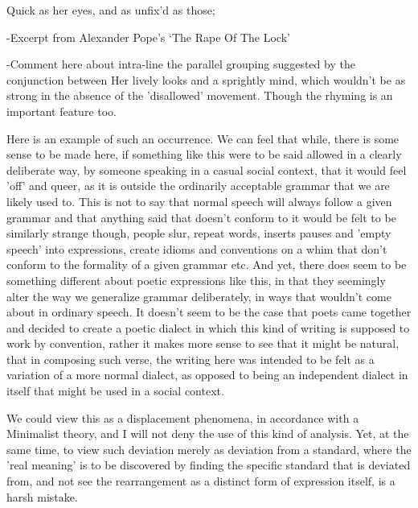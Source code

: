 \documentclass[]{article}
\begin{document}
Quick as her eyes, and as unfix’d as those;

-Excerpt from Alexander Pope’s ‘The Rape Of The Lock’



-Comment here about intra-line the parallel grouping suggested by the conjunction between Her lively looks and  a sprightly mind, which wouldn't be as strong in the absence of the 'disallowed' movement. Though the rhyming is an important feature too.



Here is an example of such an occurrence. We can feel that while, there is some sense to be made here, if something like this were to be said allowed in a clearly deliberate way, by someone speaking in a casual social context, that it would feel 'off' and queer, as it is outside the ordinarily acceptable grammar that we are likely used to. This is not to say that normal speech will always follow a given grammar and that anything said that doesn't conform to it would be felt to be similarly strange though, people slur, repeat words, inserts pauses and 'empty speech' into expressions, create idioms and conventions on a whim that don't conform to the formality of a given grammar etc. And yet, there does seem to be something different about poetic expressions like this, in that they seemingly alter the way we generalize grammar deliberately, in ways that wouldn't come about in ordinary speech. It doesn't seem to be the case that poets came together and decided to create a poetic dialect in which this kind of writing is supposed to work by convention, rather it makes more sense to see that it might be natural, that in composing such verse, the writing here was intended to be felt as a variation of a more normal dialect, as opposed to being an independent dialect in itself that might be used in a social context.



We could view this as a displacement phenomena, in accordance with a Minimalist theory, and I will not deny the use of this kind of analysis. Yet, at the same time, to view such deviation merely as deviation from a standard, where the 'real meaning' is to be discovered by finding the specific standard that is deviated from, and not see the rearrangement as a distinct form of expression itself, is a harsh mistake.
\end{document}
